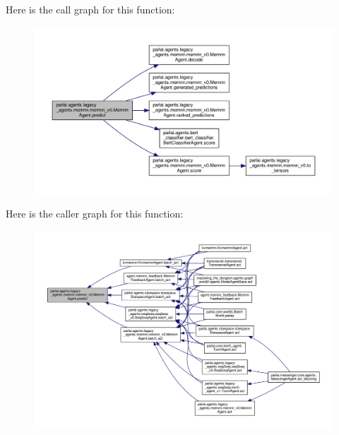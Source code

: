 Here is the call graph for this function\+:
\nopagebreak
\begin{figure}[H]
\begin{center}
\leavevmode
\includegraphics[width=350pt]{classparlai_1_1agents_1_1legacy__agents_1_1memnn_1_1memnn__v0_1_1MemnnAgent_a4e850d51ca01adc45754cc509c8b096a_cgraph}
\end{center}
\end{figure}
Here is the caller graph for this function\+:
\nopagebreak
\begin{figure}[H]
\begin{center}
\leavevmode
\includegraphics[width=350pt]{classparlai_1_1agents_1_1legacy__agents_1_1memnn_1_1memnn__v0_1_1MemnnAgent_a4e850d51ca01adc45754cc509c8b096a_icgraph}
\end{center}
\end{figure}
\mbox{\label{classparlai_1_1agents_1_1legacy__agents_1_1memnn_1_1memnn__v0_1_1MemnnAgent_aeca21a7823ef27e0f56ac7e420e2beca}} 
